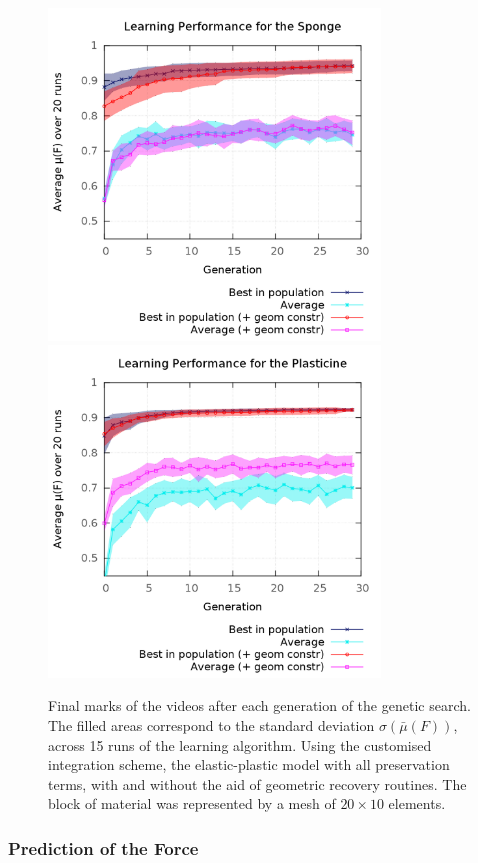 \documentclass[journal]{IEEEtran}
\newcounter{algorithm}
\begin{document}
\begin{figure}[!t]
\centering
\includegraphics[width=88mm]{arrio6}
\includegraphics[width=88mm]{arrio7}
\caption{Final marks of the videos after each generation of the genetic search.  The filled areas correspond to the standard deviation $\sigma(\bar{\mu}(F))$, across 15 runs of the learning algorithm.  Using the customised integration scheme, the elastic-plastic model with all preservation terms, with and without the aid of geometric recovery routines.  The block of material was represented by a mesh of $20 \times 10$ elements.}\label{fig:performance}
\end{figure}

\subsubsection{Prediction of the Force}
\end{document}
